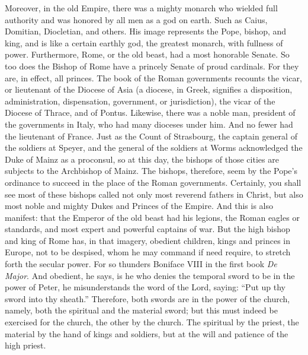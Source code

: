 Moreover, in the old Empire, there was a mighty monarch who wielded full authority and was honored by all men as a god on earth. Such as Caius, Domitian, Diocletian, and others. His image represents the Pope, bishop, and king, and is like a certain earthly god, the greatest monarch, with fullness of power. Furthermore, Rome, or the old beast, had a most honorable Senate. So too does the Bishop of Rome have a princely Senate of proud cardinals. For they are, in effect, all princes. The book of the Roman governments recounts the vicar, or lieutenant of the Diocese of Asia (a diocese, in Greek, signifies a disposition, administration, dispensation, government, or jurisdiction), the vicar of the Diocese of Thrace, and of Pontus. Likewise, there was a noble man, president of the governments in Italy, who had many dioceses under him. And no fewer had the lieutenant of France. Just as the Count of Strasbourg, the captain general of the soldiers at Speyer, and the general of the soldiers at Worms acknowledged the Duke of Mainz as a proconsul, so at this day, the bishops of those cities are subjects to the Archbishop of Mainz. The bishops, therefore, seem by the Pope’s ordinance to succeed in the place of the Roman governments. Certainly, you shall see most of these bishops called not only most reverend fathers in Christ, but also most noble and mighty Dukes and Princes of the Empire. And this is also manifest: that the Emperor of the old beast had his legions, the Roman eagles or standards, and most expert and powerful captains of war. But the high bishop and king of Rome has, in that imagery, obedient children, kings and princes in Europe, not to be despised, whom he may command if need require, to stretch forth the secular power. For so thunders Boniface VIII in the first book \textit{De Major}. And obedient, he says, is he who denies the temporal sword to be in the power of Peter, he misunderstands the word of the Lord, saying: “Put up thy sword into thy sheath.” Therefore, both swords are in the power of the church, namely, both the spiritual and the material sword; but this must indeed be exercised for the church, the other by the church. The spiritual by the priest, the material by the hand of kings and soldiers, but at the will and patience of the high priest.

